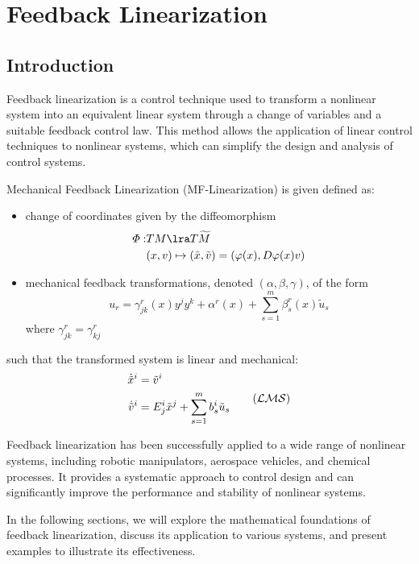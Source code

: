 \chapter{Feedback Linearization}

\section{Introduction}

Feedback linearization is a control technique used to transform a nonlinear system into an equivalent linear system through a change of variables and a suitable feedback control law. This method allows the application of linear control techniques to nonlinear systems, which can simplify the design and analysis of control systems.

Mechanical Feedback Linearization (MF-Linearization) is given defined as:

\begin{itemize}
    \item change of coordinates given by the diffeomorphism
    \begin{equation}
        \begin{split}
            \varPhi: & TM \lra T\widetilde{M} \\
            & (x,v) \mapsto (\tilde{x}, \tilde{v}) = (\varphi(x), D \varphi(x)v)
        \end{split}
    \end{equation}
    \item mechanical feedback transformations, denoted $(\alpha, \beta, \gamma)$, of the form
    \begin{equation}
        u_r = \gamma^r_{jk}(x) y^j y^k + \alpha^r (x) + \sum_{s=1}^m \beta^r_s(x) \tilde{u}_s
    \end{equation}
    where $\gamma^r_{jk} = \gamma^r_{kj}$
\end{itemize}
such that the transformed system is linear and mechanical:
\begin{equation}
    \begin{split}
        \dot{\tilde{x}}^i & = \tilde{v}^i \\
        \dot{\tilde{v}}^i & = E^i_j \tilde{x}^j + \sum_{s=1}^m b_s^i \tilde{u}_s
    \end{split} \tag{$\mathcal{LMS}$}
\end{equation}

Feedback linearization has been successfully applied to a wide range of nonlinear systems, including robotic manipulators, aerospace vehicles, and chemical processes. It provides a systematic approach to control design and can significantly improve the performance and stability of nonlinear systems.

In the following sections, we will explore the mathematical foundations of feedback linearization, discuss its application to various systems, and present examples to illustrate its effectiveness.